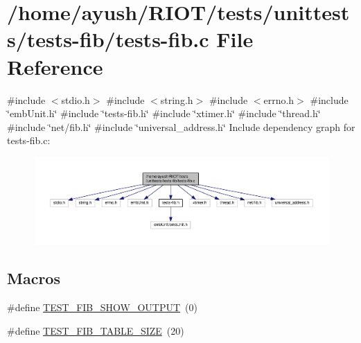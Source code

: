 \hypertarget{tests-fib_8c}{}\section{/home/ayush/\+R\+I\+O\+T/tests/unittests/tests-\/fib/tests-\/fib.c File Reference}
\label{tests-fib_8c}
{\ttfamily \#include $<$stdio.\+h$>$}\newline
{\ttfamily \#include $<$string.\+h$>$}\newline
{\ttfamily \#include $<$errno.\+h$>$}\newline
{\ttfamily \#include \char`\"{}emb\+Unit.\+h\char`\"{}}\newline
{\ttfamily \#include \char`\"{}tests-\/fib.\+h\char`\"{}}\newline
{\ttfamily \#include \char`\"{}xtimer.\+h\char`\"{}}\newline
{\ttfamily \#include \char`\"{}thread.\+h\char`\"{}}\newline
{\ttfamily \#include \char`\"{}net/fib.\+h\char`\"{}}\newline
{\ttfamily \#include \char`\"{}universal\+\_\+address.\+h\char`\"{}}\newline
Include dependency graph for tests-\/fib.c\+:
\nopagebreak
\begin{figure}[H]
\begin{center}
\leavevmode
\includegraphics[width=350pt]{tests-fib_8c__incl}
\end{center}
\end{figure}
\subsection*{Macros}
\begin{DoxyCompactItemize}
\item 
\#define \hyperlink{tests-fib_8c_ad13f12e2f5d18b92e39a9b200a6fb30b}{T\+E\+S\+T\+\_\+\+F\+I\+B\+\_\+\+S\+H\+O\+W\+\_\+\+O\+U\+T\+P\+UT}~(0)
\item 
\#define \hyperlink{tests-fib_8c_a441999bccd0b9df67ec5bc80f88c9431}{T\+E\+S\+T\+\_\+\+F\+I\+B\+\_\+\+T\+A\+B\+L\+E\+\_\+\+S\+I\+ZE}~(20)
\end{DoxyCompactItemize}
